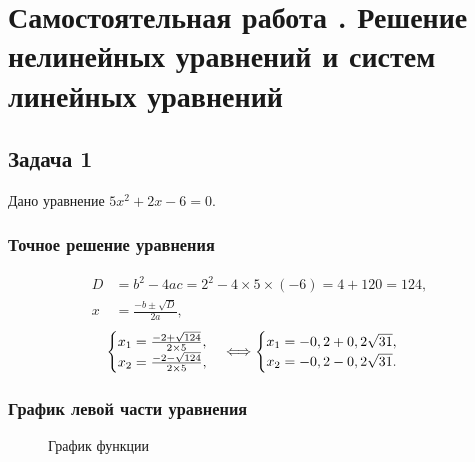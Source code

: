 \documentclass[10pt, a4paper, titlepage]{article}
\begin{document}
\section{Самостоятельная работа . Решение нелинейных уравнений и систем линейных уравнений}

\subsection{Задача 1}

Дано уравнение $5x^2+2x-6=0$.

\subsubsection*{Точное решение уравнения}

\begin{align*}
D &= b^2-4ac=2^2-4\times5\times(-6)=4+120=124, \\
x &= \frac{-b\pm\sqrt{D}}{2a},
\end{align*}
\begin{equation*}
    \begin{cases}
        $$x_1=\frac{-2+\sqrt{124}}{2\times5}$$, \\
        $$x_2=\frac{-2-\sqrt{124}}{2\times5}$$,
    \end{cases}
    \Longleftrightarrow
    \begin{cases}
        $$x_1=-0,2+0,2\sqrt{31}$$, \\
        $$x_2=-0,2-0,2\sqrt{31}$$.
    \end{cases}
\end{equation*} 

\subsubsection*{График левой части уравнения}
\begin{figure}[H]
    \centering
    \caption{График функции}
    \label{sr1Task1Function}
\end{figure}
\end{document}
